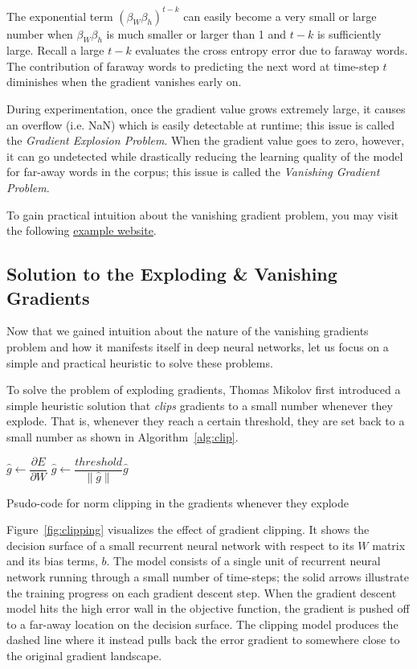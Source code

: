 \documentclass{tufte-handout}
\begin{document}
The exponential term $(\beta_W \beta_h)^{t-k}$ can easily become a very small or large number when $\beta_W \beta_h$ is much smaller or larger than 1 and $t-k$ is sufficiently large. Recall a large $t-k$ evaluates the cross entropy error due to faraway words. The contribution of faraway words to predicting the next word at time-step $t$ diminishes when the gradient vanishes early on.

During experimentation, once the gradient value grows extremely large, it causes an overflow (i.e. NaN) which is easily detectable at runtime; this issue is called the \textit{Gradient Explosion Problem}. When the gradient value goes to zero, however, it can go undetected while drastically reducing the learning quality of the model for far-away words in the corpus; this issue is called the \textit{Vanishing Gradient Problem}.

To gain practical intuition about the vanishing gradient problem, you may visit the following \uline{\href{http://cs224d.stanford.edu/notebooks/vanishing_grad_example.html}{example website}}.

\subsection{Solution to the Exploding \& Vanishing Gradients}
Now that we gained intuition about the nature of the vanishing gradients problem and how it manifests itself in deep neural networks, let us focus on a simple and practical heuristic to solve these problems. 

To solve the problem of exploding gradients, Thomas Mikolov first introduced a simple heuristic solution that \textit{clips} gradients to a small number whenever they explode. That is, whenever they reach a certain threshold, they are set back to a small number as shown in Algorithm~\ref{alg:clip}.

\begin{algorithm}
\begin{algorithmic}
\State $\hat{g} \gets \dfrac{\partial E}{\partial W}$
    \State $\hat{g} \gets \dfrac{threshold}{\parallel \hat{g} \parallel} \hat{g}$
\EndIf
\end{algorithmic}
\caption{Psudo-code for norm clipping in the gradients whenever they explode}
\label{alg:clip}
\end{algorithm}

Figure~\ref{fig:clipping} visualizes the effect of gradient clipping. It shows the decision surface of a small recurrent neural network with respect to its $W$ matrix and its bias terms, $b$. The model consists of a single unit of recurrent neural network running through a small number of time-steps; the solid arrows illustrate the training progress on each gradient descent step. When the gradient descent model hits the high error wall in the objective function, the gradient is pushed off to a far-away location on the decision surface. The clipping model produces the dashed line where it instead pulls back the error gradient to somewhere close to the original gradient landscape.
\end{document}
